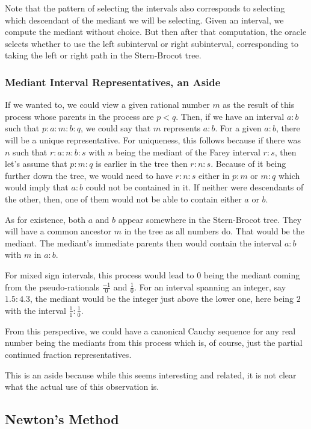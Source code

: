 \documentclass[12pt]{article}
\begin{document}
Note that the pattern of selecting the intervals also corresponds to selecting which descendant of the mediant we will be selecting. Given an interval, we compute the mediant without choice. But then after that computation, the oracle selects whether to use the left subinterval or right subinterval, corresponding to taking the left or right path in the Stern-Brocot tree.

\subsubsection{Mediant Interval Representatives, an Aside}

If we wanted to, we could view a given rational number $m$ as the result of this process whose parents in the process are $p < q$. Then, if we have an interval $a:b$ such that $p : a : m : b : q$, we could say that $m$ represents $a:b$. For a given $a:b$, there will be a unique representative. For uniqueness, this follows because if there was $n$ such that $r : a: n: b : s$ with $n$ being the mediant of the Farey interval $r:s$, then let's assume that $p:m:q$ is earlier in the tree then $r:n:s$. Because of it being further down the tree, we would need to have $r:n:s$ either in $p:m$ or $m:q$ which would imply that $a:b$ could not be contained in it. If neither were descendants of the other, then, one of them would not be able to contain either $a$ or $b$. 

As for existence, both $a$ and $b$ appear somewhere in the Stern-Brocot tree. They will have a common ancestor $m$ in the tree as all numbers do. That would be the mediant. The mediant's immediate parents then would contain the interval $a:b$ with $m$ in $a:b$.

For mixed sign intervals, this process would lead to $0$ being the mediant coming from the pseudo-rationals $\frac{-1}{0}$ and $\frac{1}{0}$. For an interval spanning an integer, say $1.5:4.3$, the mediant would be the integer just above the lower one,  here being $2$ with the interval $\frac{1}{1}: \frac{1}{0}$.

From this perspective, we could have a canonical Cauchy sequence for any real number being the mediants from this process which is, of course, just the partial continued fraction representatives. 

This is an aside because while this seems interesting and related, it is not clear what the actual use of this observation is. 

\subsection{Newton's Method}
\end{document}
